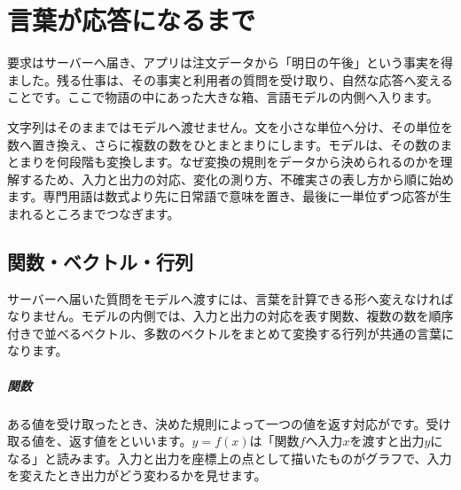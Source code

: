 \chapter{言葉が応答になるまで}
\label{chap:machine-learning}

\begin{chapterabstract}
要求はサーバーへ届き、アプリは注文データから「明日の午後」という事実を得ました。残る仕事は、その事実と利用者の質問を受け取り、自然な応答へ変えることです。ここで物語の中にあった大きな箱、言語モデルの内側へ入ります。

文字列はそのままではモデルへ渡せません。文を小さな単位へ分け、その単位を数へ置き換え、さらに複数の数をひとまとまりにします。モデルは、その数のまとまりを何段階も変換します。なぜ変換の規則をデータから決められるのかを理解するため、入力と出力の対応、変化の測り方、不確実さの表し方から順に始めます。専門用語は数式より先に日常語で意味を置き、最後に一単位ずつ応答が生まれるところまでつなぎます。
\end{chapterabstract}


\section{関数・ベクトル・行列}
\label{sec:06-machine-learning-01}

サーバーへ届いた質問をモデルへ渡すには、言葉を計算できる形へ変えなければなりません。モデルの内側では、入力と出力の対応を表す関数、複数の数を順序付きで並べるベクトル、多数のベクトルをまとめて変換する行列が共通の言葉になります。

\begingroup
\begingroup
\paragraph{関数}
        ある値を受け取ったとき、決めた規則によって一つの値を返す対応がです。受け取る値を、返す値をといいます。$y=f(x)$は「関数$f$へ入力$x$を渡すと出力$y$になる」と読みます。入力と出力を座標上の点として描いたものがグラフで、入力を変えたとき出力がどう変わるかを見せます。

      \centering
\par
\endgroup
\medskip
\begingroup
